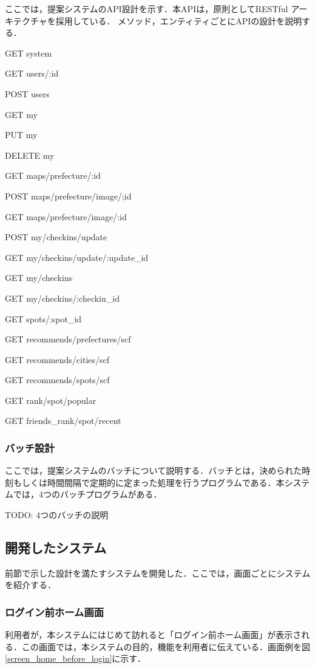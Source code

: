 \documentclass{jsarticle}
\begin{document}
ここでは，提案システムのAPI設計を示す．本APIは，原則としてRESTful アーキテクチャを採用している．
メソッド，エンティティごとにAPIの設計を説明する．


GET system

GET users/:id

POST users

GET my

PUT my

DELETE my

GET maps/prefecture/:id

POST maps/prefecture/image/;id

GET maps/prefecture/image/:id

POST my/checkins/update

GET my/checkins/update/:update\_id

GET my/checkins

GET my/checkins/:checkin\_id

GET spots/:spot\_id

GET recommends/prefectures/scf

GET recommends/cities/scf

GET recommends/spots/scf

GET rank/spot/popular

GET friends\_rank/spot/recent

\subsubsection{バッチ設計}

ここでは，提案システムのバッチについて説明する．バッチとは，決められた時刻もしくは時間間隔で定期的に定まった処理を行うプログラムである．本システムでは，4つのバッチプログラムがある．

TODO: 4つのバッチの説明

\subsection{開発したシステム}

前節で示した設計を満たすシステムを開発した．ここでは，画面ごとにシステムを紹介する．

\subsubsection{ログイン前ホーム画面}

利用者が，本システムにはじめて訪れると「ログイン前ホーム画面」が表示される．この画面では，本システムの目的，機能を利用者に伝えている．画面例を図\ref{screen_home_before_login}に示す．
\end{document}

